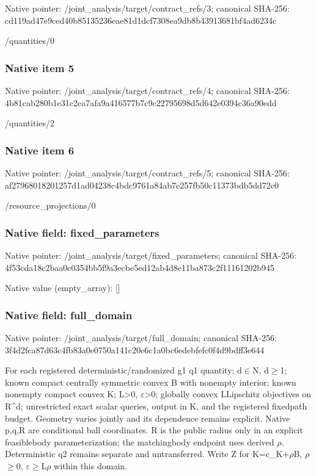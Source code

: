 \documentclass[10pt,a4paper]{article}
\begin{document}
Native pointer: /joint\_analysis/target/contract\_refs/3; canonical SHA-256: cd119ad47e9ced40b8513523\allowbreak{}6eae81d1dcf7308ea9db8b43\allowbreak{}913681bf4ad6234c


/quantities/0


\subsubsection{Native item 5}


Native pointer: /joint\_analysis/target/contract\_refs/4; canonical SHA-256: 4b81cab280b1e31c2ea7afa9\allowbreak{}a416577b7c9c22795698d5d6\allowbreak{}42e0394c36a90edd


/quantities/2


\subsubsection{Native item 6}


Native pointer: /joint\_analysis/target/contract\_refs/5; canonical SHA-256: af27968018201257d1ad0423\allowbreak{}8c4bdc9761a84ab7c257fb50\allowbreak{}c11373bdb5dd72c0


/resource\_projections/0


\subsubsection{Native field: fixed\_parameters}


Native pointer: /joint\_analysis/target/fixed\_parameters; canonical SHA-256: 4f53cda18c2baa0c0354bb5f\allowbreak{}9a3ecbe5ed12ab4d8e11ba87\allowbreak{}3c2f11161202b945



Native value (empty\_array): []



\subsubsection{Native field: full\_domain}


Native pointer: /joint\_analysis/target/full\_domain; canonical SHA-256: 3f4d2fca87d63c4fb83a0e07\allowbreak{}50a141c20e6c1a0bc6edebfe\allowbreak{}fc0f4d9bdff3e644


For each registered deterministic/randomized g1 q1 quantity: d\ensuremath{\in}N, d\ensuremath{\ge}1; known compact centrally symmetric convex B with nonempty interior; known nonempty compact convex K; L>0, \ensuremath{\varepsilon}>0; globally convex LLipschitz objectives on R\textasciicircum{}d; unrestricted exact scalar queries, output in K, and the registered fixedpath budget. Geometry varies jointly and its dependence remains explicit. Native p,q,R are conditional ball coordinates. R is the public radius only in an explicit feasiblebody parameterization; the matchingbody endpoint uses derived \ensuremath{\rho}. Deterministic q2 remains separate and untransferred. Write Z for K=c\_K+\ensuremath{\rho}B, \ensuremath{\rho}\ensuremath{\ge}0, \ensuremath{\varepsilon}\ensuremath{\ge}L\ensuremath{\rho} within this domain.
\end{document}
